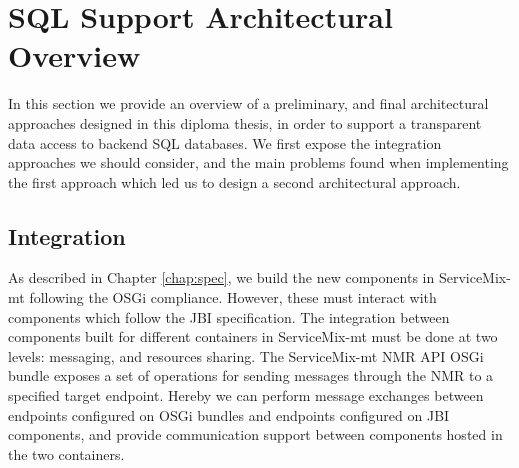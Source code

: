 \section{SQL Support Architectural Overview}
\label{sec:designsql}

In this section we provide an overview of a preliminary, and final architectural approaches designed in this diploma thesis, in order to support a transparent data access to backend \ac{SQL} databases. We first expose the integration approaches we should consider, and the main problems found when implementing the first approach which led us to design a second architectural approach. 


\subsection{Integration}

As described in Chapter \ref{chap:spec}, we build the new components in ServiceMix-mt following the \ac{OSGi} compliance. However, these must interact with components which follow the \ac{JBI} specification. The integration between components built for different containers in ServiceMix-mt must be done at two levels: messaging, and resources sharing. The ServiceMix-mt \ac{NMR} \ac{API} \ac{OSGi} bundle exposes a set of operations for sending messages through the \ac{NMR} to a specified target endpoint. Hereby we can perform message exchanges between endpoints configured on \ac{OSGi} bundles and endpoints configured on \ac{JBI} components, and provide communication support between components hosted in the two containers. 

